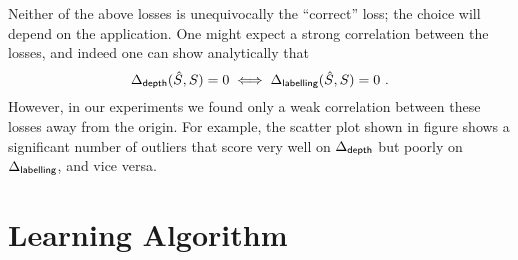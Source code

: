 Neither of the above losses is unequivocally the ``correct'' loss; the
choice will depend on the application. One might expect a strong
correlation between the losses, and indeed one can show analytically
that
\begin{equation}
  \DepthLoss(\EstSeam,\Seam) = 0
  \iff
  \LblLoss(\EstSeam,\Seam) = 0 ~.
\end{equation}
However, in our experiments we found only a weak correlation between
these losses away from the origin. For example, the scatter plot shown
in figure  shows a significant number of
outliers that score very well on $\DepthLoss$ but poorly on
$\LblLoss$, and vice versa.

\section{Learning Algorithm}
\label{sec:learning}

